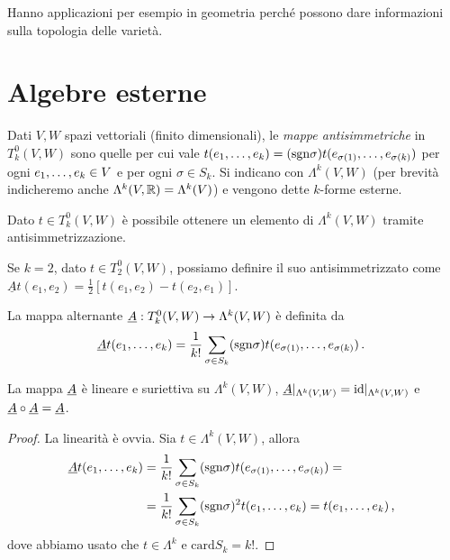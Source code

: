 Hanno applicazioni per esempio in geometria perché possono dare informazioni sulla topologia delle varietà.

\section{Algebre esterne}

\begin{definition}
 
Dati $V,W$ spazi vettoriali (finito dimensionali), le \emph{mappe antisimmetriche} in $T^0_k(V,W)$ sono quelle per cui vale $t(\seqb{e}{k}{,}) = (\sgn \sigma) t(e_{\sigma(1)},\ldots, e_{\sigma(k)})$ per ogni $\seqb{e}{k}{,} \in V$ e per ogni $\sigma\in S_k$.
Si indicano con $\Lambda^k(V,W)$ (per brevità indicheremo anche $\Lambda^k(V,\R) = \Lambda^k(V)$) e vengono dette $k$-forme esterne.

\end{definition}

Dato $t\in T^0_k(V,W)$ è possibile ottenere un elemento di $\Lambda^k(V,W)$ tramite antisimmetrizzazione. 
\begin{example}
	Se $k=2$, dato $t\in T^0_2(V,W)$, possiamo definire il suo antisimmetrizzato come $\underline{A}t(e_1,e_2) = \frac 12 [t(e_1,e_2) - t(e_2,e_1)]$.
\end{example}

\begin{definition}
	La mappa alternante $\antisimm:T^0_k(V,W) \to \Lambda^k(V,W)$ è definita da
	\begin{equation*}
		\antisimm t(\seqb{e}{k}{,}) = \frac 1 {k!} \sum_{\sigma \in S_k} (\sgn \sigma) t(e_{\sigma(1)},\ldots, e_{\sigma(k)}) \punto
	\end{equation*}
\end{definition}

\begin{proposition}
	La mappa $\antisimm$ è lineare e suriettiva su $\Lambda^k(V,W)$, $\antisimm\restrict{\Lambda^k(V,W)} = \id\restrict{\Lambda^k(V,W)}$ e $\antisimm \circ \antisimm = \antisimm$.
\end{proposition}
\begin{proof}
	La linearità è ovvia. Sia $t\in\Lambda^k(V,W)$, allora
	\begin{align*}
		\antisimm t(\seqb{e}{k}{,}) &= \frac 1 {k!} \sum_{\sigma \in S_k} (\sgn \sigma) t(e_{\sigma(1)},\ldots, e_{\sigma(k)}) =\\
		& = \frac 1 {k!} \sum_{\sigma \in S_k} (\sgn \sigma)^2 t(\seqb{e}{k}{,}) = t (\seqb{e}{k}{,}) \virgola
	\end{align*}
	dove abbiamo usato che $t\in\Lambda^k$ e $\mathrm{card} S_k = k!$.
\end{proof}

